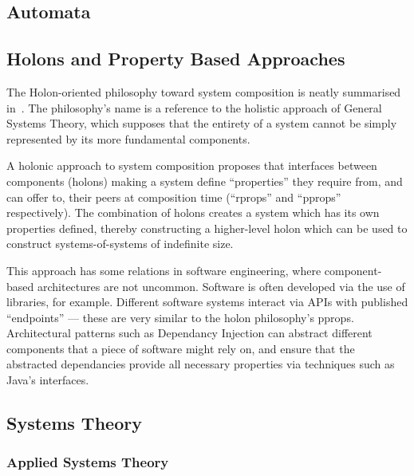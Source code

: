 \subsection{Automata}


\subsection{Holons and Property Based Approaches}
The Holon-oriented philosophy toward system composition is neatly summarised
in~\cite{blair2015holons}. The philosophy's name is a reference to the holistic
approach of General Systems Theory, which supposes that the entirety of a system
cannot be simply represented by its more fundamental components.
\par

A holonic approach to system composition proposes that interfaces between
components (holons) making a system define ``properties'' they require from, and
can offer to, their peers at composition time (``rprops'' and ``pprops''
respectively). The combination of holons creates a system which has its own
properties defined, thereby constructing a higher-level holon which can be used
to construct systems-of-systems of indefinite size.
\par

This approach has some relations in software engineering, where component-based
architectures are not uncommon. Software is often developed via the use of
libraries, for example. Different software systems interact via APIs with
published ``endpoints'' --- these are very similar to the holon philosophy's
pprops. Architectural patterns such as Dependancy Injection can abstract
different components that a piece of software might rely on, and ensure that the
abstracted dependancies provide all necessary properties via techniques such as
Java's interfaces.
\par

\subsection{Systems Theory}

\subsubsection{Applied Systems Theory}\label{sec:review-applied-systems-theory}


